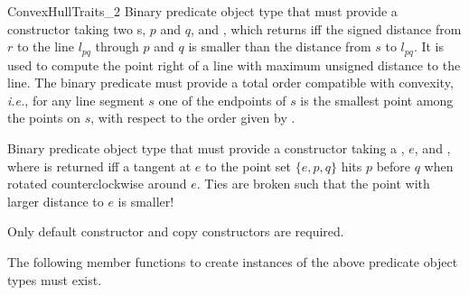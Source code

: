 \begin{ccRefConcept}{ConvexHullTraits_2}
%
       {Binary predicate object type that must provide a constructor taking
        two s, $p$ and $q$, and
        , which returns  iff
        the signed distance from $r$ to the line $l_{pq}$ through $p$ and $q$
        is smaller than the distance from $s$ to $l_{pq}$. It is used to
        compute the point right of a line with maximum unsigned distance to
        the line. The binary predicate must provide a total order compatible
        with convexity, {\it i.e.}, for any line segment $s$ one of the 
        endpoints 
        of $s$ is the smallest point among the points on $s$, with respect to
        the order given by .}

%
       {Binary predicate object type that must provide a constructor taking a
        , $e$, and ,
        where  is returned iff a tangent at $e$ to the point set
        $\{e,p,q\}$ hits $p$ before $q$ when rotated counterclockwise around 
        $e$.
        Ties are broken such that the point with larger distance to $e$
        is smaller!}


\ccCreation
{}  %

Only default constructor and copy constructors are required.

\setlength\parskip{0mm}
\ccOperations

The following member functions to create instances of the above predicate
object types must exist. 

\ccGlue
{}
\ccGlue
{}
\ccGlue
{}
\ccGlue
{}
\ccGlue
{}


\ccHasModels

 \\
 \\
 \\
 \\
 \\
 \\
\ccAutoIndexingOn

\ccSeeAlso


\ccParDims
\end{ccRefConcept}


